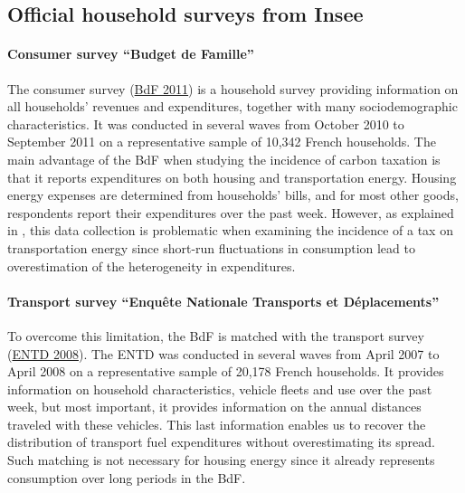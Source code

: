 \documentclass[12pt]{article} %
\begin{document}
\begin{appendices}
\subsection{Official household surveys from Insee \label{appendix:official_surveys_insee}}

\paragraph{Consumer survey ``Budget de Famille''}



The consumer survey (\href{https://www.insee.fr/en/metadonnees/source/serie/s1194}{BdF 2011}) is a household survey providing information on all households' revenues and expenditures, together with many sociodemographic characteristics. It was conducted in several waves from October 2010 to September 2011 on a representative sample of 10,342 French households. The main advantage of the BdF when studying the incidence of carbon taxation is that it reports expenditures on both housing and transportation energy. Housing energy expenses are determined from households' bills, and for most other goods, respondents report their expenditures over the past week. However, as explained in \citet{douenne_2020}, this data collection is problematic when examining the incidence of a tax on transportation energy since short-run fluctuations in consumption lead to overestimation of the heterogeneity in expenditures.

\paragraph{Transport survey ``Enquête Nationale Transports et Déplacements''}

To overcome this limitation, the BdF is matched with the transport survey (\href{https://www.insee.fr/en/metadonnees/source/serie/s1277}{ENTD 2008}). The ENTD was conducted in several waves from April 2007 to April 2008 on a representative sample of 20,178 French households. It provides information on household characteristics, vehicle fleets and use over the past week, but most important, it provides information on the annual distances traveled with these vehicles. This last information enables us to recover the distribution of transport fuel expenditures without overestimating its spread. Such matching is not necessary for housing energy since it already represents consumption over long periods in the BdF.


\end{appendices}
\end{document}
